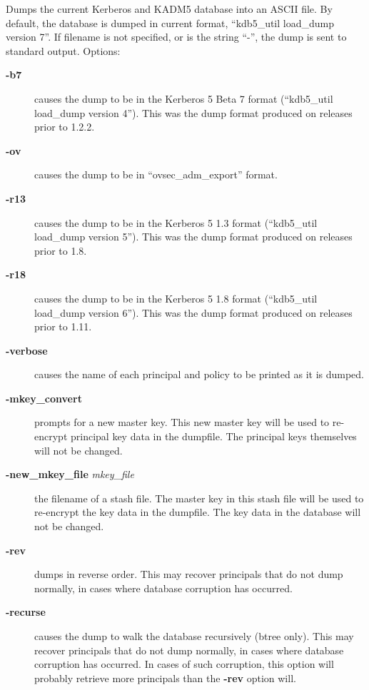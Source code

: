 \documentclass[letterpaper,10pt,english]{sphinxmanual}
\begin{document}
Dumps the current Kerberos and KADM5 database into an ASCII file.  By
default, the database is dumped in current format, ``kdb5\_util
load\_dump version 7''.  If filename is not specified, or is the string
``-'', the dump is sent to standard output.  Options:
\begin{description}
\item[{\textbf{-b7}}] \leavevmode
causes the dump to be in the Kerberos 5 Beta 7 format (``kdb5\_util
load\_dump version 4'').  This was the dump format produced on
releases prior to 1.2.2.

\item[{\textbf{-ov}}] \leavevmode
causes the dump to be in ``ovsec\_adm\_export'' format.

\item[{\textbf{-r13}}] \leavevmode
causes the dump to be in the Kerberos 5 1.3 format (``kdb5\_util
load\_dump version 5'').  This was the dump format produced on
releases prior to 1.8.

\item[{\textbf{-r18}}] \leavevmode
causes the dump to be in the Kerberos 5 1.8 format (``kdb5\_util
load\_dump version 6'').  This was the dump format produced on
releases prior to 1.11.

\item[{\textbf{-verbose}}] \leavevmode
causes the name of each principal and policy to be printed as it
is dumped.

\item[{\textbf{-mkey\_convert}}] \leavevmode
prompts for a new master key.  This new master key will be used to
re-encrypt principal key data in the dumpfile.  The principal keys
themselves will not be changed.

\item[{\textbf{-new\_mkey\_file} \emph{mkey\_file}}] \leavevmode
the filename of a stash file.  The master key in this stash file
will be used to re-encrypt the key data in the dumpfile.  The key
data in the database will not be changed.

\item[{\textbf{-rev}}] \leavevmode
dumps in reverse order.  This may recover principals that do not
dump normally, in cases where database corruption has occurred.

\item[{\textbf{-recurse}}] \leavevmode
causes the dump to walk the database recursively (btree only).
This may recover principals that do not dump normally, in cases
where database corruption has occurred.  In cases of such
corruption, this option will probably retrieve more principals
than the \textbf{-rev} option will.

\end{description}
\end{document}
